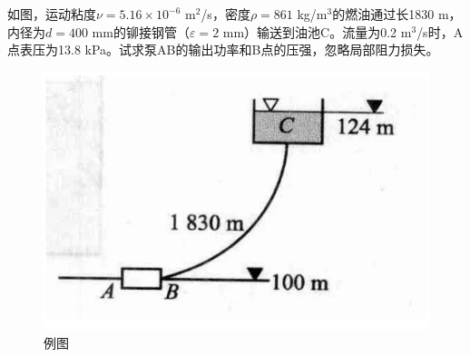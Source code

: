 \begin{example}
	如图，运动粘度$\nu = 5.16 \times 10^{-6}$ m$^2$/s，密度$\rho = 861$ kg/m$^3$的燃油通过长1830 m，内径为$d = 400$ mm的铆接钢管（$\varepsilon = 2$ mm）输送到油池C。流量为0.2 m$^3$/s时，A点表压为13.8 kPa。试求泵AB的输出功率和B点的压强，忽略局部阻力损失。
	
	\begin{figure}[H]
		\centering
		\includegraphics[scale=0.4]{figures/C9-fig1.png}
		\caption{例图}
	\end{figure}


\end{example}

